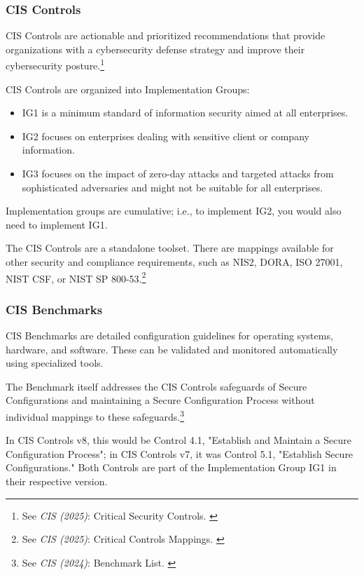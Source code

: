 \subsubsection{CIS Controls}

CIS Controls are actionable and prioritized recommendations that provide organizations with a cybersecurity defense strategy and improve their cybersecurity posture.\footnote{See \textit{CIS (2025)}: Critical Security Controls. \cite{cisControls}}

CIS Controls are organized into Implementation Groups:

\begin{itemize}
    \item IG1 is a minimum standard of information security aimed at all enterprises.
    \item IG2 focuses on enterprises dealing with sensitive client or company information.
    \item IG3 focuses on the impact of zero-day attacks and targeted attacks from sophisticated adversaries and might not be suitable for all enterprises.
\end{itemize}

Implementation groups are cumulative; i.e., to implement IG2, you would also need to implement IG1.

The CIS Controls are a standalone toolset. There are mappings available for other security and compliance requirements, such as NIS2, DORA, ISO 27001, NIST CSF, or NIST SP 800-53.\footnote{See \textit{CIS (2025)}: Critical Controls Mappings. \cite{cisMappings}}

\subsubsection{CIS Benchmarks}

CIS Benchmarks are detailed configuration guidelines for operating systems, hardware, and software. These can be validated and monitored automatically using specialized tools.

The Benchmark itself addresses the CIS Controls safeguards of Secure
Configurations and maintaining a Secure Configuration Process without individual mappings to these safeguards.\footnote{See \textit{CIS (2024)}: Benchmark List. \cite{cisBenchmarks}}

In CIS Controls v8, this would be Control 4.1, "Establish and Maintain a Secure Configuration Process"; in CIS Controls v7, it was Control 5.1, "Establish Secure Configurations." Both Controls are part of the Implementation Group IG1 in their respective version.

